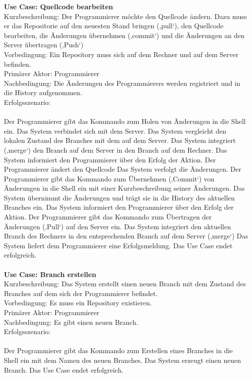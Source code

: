 \documentclass[a4paper]{article}
\begin{document}
\textbf{Use Case: 			Quellcode bearbeiten}\\
Kurzbeschreibung: 	Der Programmierer möchte den Quellcode ändern. Dazu muss er das Repositorie auf den neuesten Stand bringen (‚pull‘), den Quellcode bearbeiten, die Änderungen übernehmen (‚commit‘) und die Änderungen an den Server übertragen (‚Push‘)\\
Vorbedingung:	Ein Repository muss sich auf dem Rechner und auf dem Server befinden.\\
Primärer Aktor:	Programmierer\\
Nachbedingung:	Die Änderungen des Programmierers werden registriert und in die History aufgenommen.\\
Erfolgsszenario:\\
\\
Der Programmierer gibt das Kommando zum Holen von Änderungen in die Shell ein. Das System verbindet sich mit dem Server. Das System vergleicht den lokalen Zustand des Branches mit dem auf dem Server.
Das System integriert (‚\gls{merge}‘) den Branch auf dem Server in den Branch auf dem Rechner. Das System informiert den Programmierer über den Erfolg der Aktion. Der Programmierer ändert den Quellcode
Das System verfolgt die Änderungen. Der Programmierer gibt das Kommando zum Übernehmen (‚Commit‘) von Änderungen in die Shell ein mit einer Kurzbeschreibung seiner Änderungen. Das System übernimmt die Änderungen und trägt sie in die History des aktuellen Branches ein. Das System informiert den Programmierer über den Erfolg der Aktion. Der Programmierer gibt das Kommando zum Übertragen der Änderungen (‚Pull‘) auf den Server ein. Das System integriert den aktuellen Branch des Rechners in den entsprechenden Branch auf dem Server (‚\gls{merge}‘) Das System liefert dem Programmierer eine Erfolgsmeldung. Das Use Case endet erfolgreich.\\
\\
\textbf{Use Case: 			Branch erstellen}\\
Kurzbeschreibung: 	Das System erstellt einen neuen Branch mit dem Zustand des Branches auf dem sich der Programmierer befindet.\\
Vorbedingung:	Es muss ein Repository existieren.\\
Primärer Aktor:	Programmierer\\
Nachbedingung:	Es gibt einen neuen Branch.\\
Erfolgsszenario:\\
\\
Der Programmierer gibt das Kommando zum Erstellen eines Branches in die Shell ein mit dem Namen des neuen Branches. Das System erzeugt einen neuen Branch. Das Use Case endet erfolgreich.\\
\end{document}
